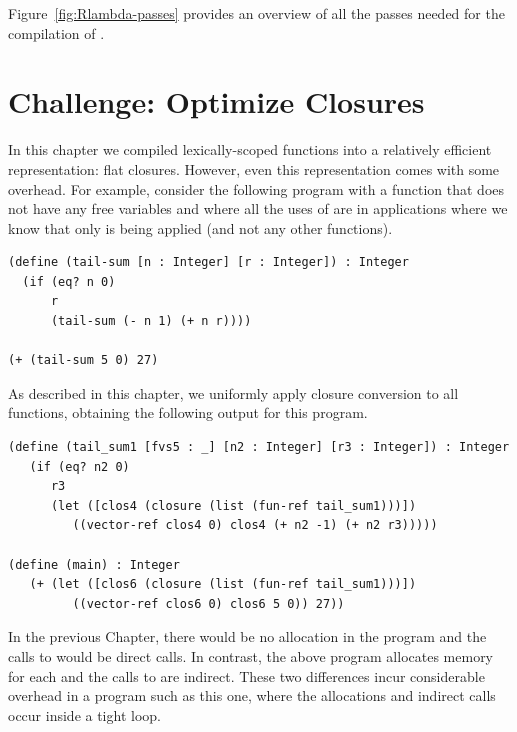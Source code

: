\documentclass[11pt]{book}
\begin{document}
Figure~\ref{fig:Rlambda-passes} provides an overview of all the passes needed
for the compilation of \LangLam{}.

\clearpage

\section{Challenge: Optimize Closures}
\label{sec:optimize-closures}

In this chapter we compiled lexically-scoped functions into a
relatively efficient representation: flat closures. However, even this
representation comes with some overhead. For example, consider the
following program with a function  that does not have
any free variables and where all the uses of  are in
applications where we know that only  is being applied
(and not any other functions).
\begin{center}
\begin{minipage}{0.95\textwidth}
\begin{lstlisting}
(define (tail-sum [n : Integer] [r : Integer]) : Integer
  (if (eq? n 0)
      r
      (tail-sum (- n 1) (+ n r))))

(+ (tail-sum 5 0) 27)
\end{lstlisting}
\end{minipage}
\end{center}
As described in this chapter, we uniformly apply closure conversion to
all functions, obtaining the following output for this program.
\begin{center}
\begin{minipage}{0.95\textwidth}
\begin{lstlisting}
(define (tail_sum1 [fvs5 : _] [n2 : Integer] [r3 : Integer]) : Integer
   (if (eq? n2 0)
      r3
      (let ([clos4 (closure (list (fun-ref tail_sum1)))])
         ((vector-ref clos4 0) clos4 (+ n2 -1) (+ n2 r3)))))

(define (main) : Integer
   (+ (let ([clos6 (closure (list (fun-ref tail_sum1)))])
         ((vector-ref clos6 0) clos6 5 0)) 27))
\end{lstlisting}
\end{minipage}
\end{center}

In the previous Chapter, there would be no allocation in the program
and the calls to  would be direct calls. In contrast,
the above program allocates memory for each  and the
calls to  are indirect. These two differences incur
considerable overhead in a program such as this one, where the
allocations and indirect calls occur inside a tight loop.
\end{document}

